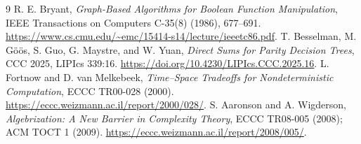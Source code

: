 \documentclass[11pt]{article}
\begin{document}
\begin{thebibliography}{9}
 R. E. Bryant,
\emph{Graph-Based Algorithms for Boolean Function Manipulation},
IEEE Transactions on Computers C-35(8) (1986), 677--691.
\url{https://www.cs.cmu.edu/~emc/15414-s14/lecture/ieeetc86.pdf}.
 T. Besselman, M. G\"o\"os, S. Guo, G. Maystre, and
W. Yuan, \emph{Direct Sums for Parity Decision Trees}, CCC 2025,
LIPIcs 339:16. \url{https://doi.org/10.4230/LIPIcs.CCC.2025.16}.
 L. Fortnow and D. van Melkebeek,
\emph{Time--Space Tradeoffs for Nondeterministic Computation},
ECCC TR00-028 (2000).
\url{https://eccc.weizmann.ac.il/report/2000/028/}.
 S. Aaronson and A. Wigderson,
\emph{Algebrization: A New Barrier in Complexity Theory},
ECCC TR08-005 (2008); ACM TOCT 1 (2009).
\url{https://eccc.weizmann.ac.il/report/2008/005/}.
\end{thebibliography}

\end{document}
